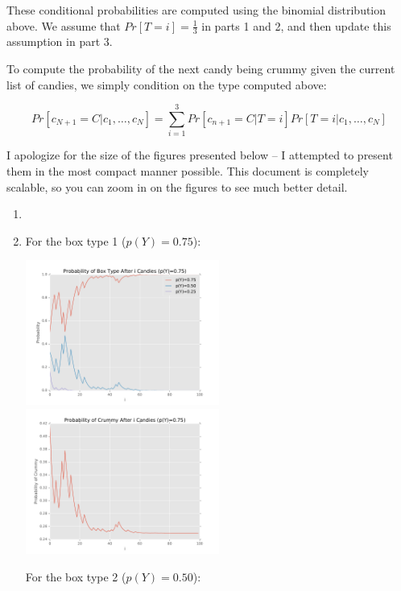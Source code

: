 \documentclass[fleqn]{homework}
\begin{document}
\begin{problem}{1}
    These conditional probabilities are computed using the binomial distribution
    above.  We assume that $Pr[T=i]=\frac{1}{3}$ in parts 1 and 2, and then
    update this assumption in part 3.

    To compute the probability of the next candy being crummy given the current
    list of candies, we simply condition on the type computed above:

    \begin{equation}
      Pr[c_{N+1} = C | c_1, \dots, c_N] = \sum_{i=1}^3 Pr[c_{n+1}=C|T=i] Pr[T=i|c_1, \dots, c_N]
    \end{equation}

    I apologize for the size of the figures presented below -- I attempted to
    present them in the most compact manner possible.  This document is
    completely scalable, so you can zoom in on the figures to see much better
    detail.

    \begin{enumerate}[1.] 
    \item \item For the box type 1 ($p(Y)=0.75$):

      \includegraphics[width=0.5\textwidth]{p1_part1_0_75.pdf}
      \includegraphics[width=0.5\textwidth]{p1_part2_0_75.pdf}

      For the box type 2 ($p(Y)=0.50$):


\end{enumerate}
\end{problem}
\end{document}
